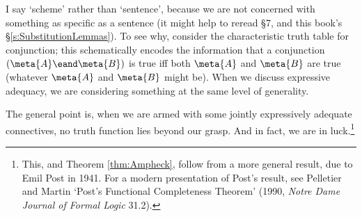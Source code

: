 I say `scheme' rather than `sentence', because we are not concerned with something as specific as a sentence (it might help to reread \forallxref{} \S7, and this book's \S\ref{s:SubstitutionLemmas}). To see why, consider the characteristic truth table for conjunction; this schematically encodes the information that a conjunction $(\meta{A} \eand \meta{B})$ is true iff both $\meta{A}$ and $\meta{B}$ are true (whatever $\meta{A}$ and $\meta{B}$ might be). When we discuss expressive adequacy, we are considering something at the same level of generality. 

The general point is, when we are armed with some jointly expressively adequate connectives, no truth function lies beyond our grasp. And in fact, we are in luck.\footnote{This, and Theorem \ref{thm:Ampheck}, follow from a more general result, due to Emil Post in 1941. For a modern presentation of Post's result, see Pelletier and Martin  `Post's Functional Completeness Theorem' (1990, \emph{Notre Dame Journal of Formal Logic} 31.2).}
